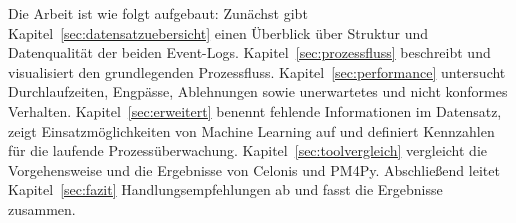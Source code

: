 Die Arbeit ist wie folgt aufgebaut: Zunächst gibt Kapitel~\ref{sec:datensatzuebersicht} einen Überblick über Struktur und Datenqualität der beiden Event-Logs.
Kapitel~\ref{sec:prozessfluss} beschreibt und visualisiert den grundlegenden Prozessfluss.
Kapitel~\ref{sec:performance} untersucht Durchlaufzeiten, Engpässe, Ablehnungen sowie unerwartetes und nicht konformes Verhalten.
Kapitel~\ref{sec:erweitert} benennt fehlende Informationen im Datensatz, zeigt Einsatzmöglichkeiten von Machine Learning auf und definiert Kennzahlen für die laufende Prozessüberwachung.
Kapitel~\ref{sec:toolvergleich} vergleicht die Vorgehensweise und die Ergebnisse von Celonis und PM4Py.
Abschließend leitet Kapitel~\ref{sec:fazit} Handlungsempfehlungen ab und fasst die Ergebnisse zusammen.










